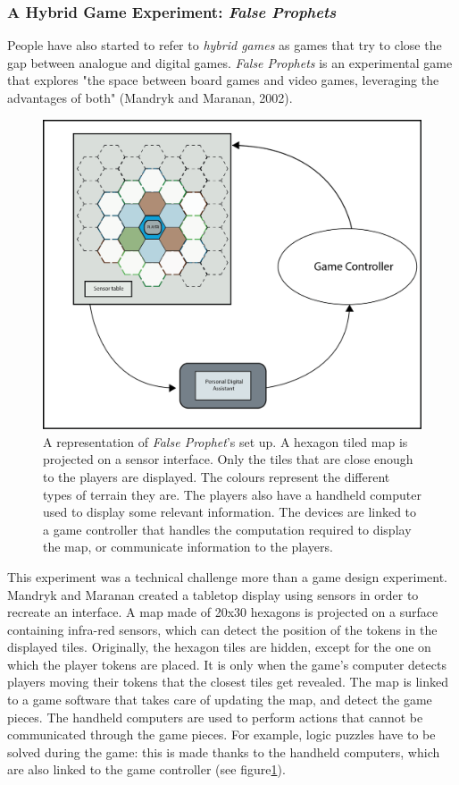\subsubsection{A Hybrid Game Experiment: \textit{False Prophets}}
People have also started to refer to \textit{hybrid games} as games that try to close the gap between analogue and digital games. \textit{False Prophets} is an experimental game that explores "the space between board games and video games, leveraging the advantages of both" (Mandryk and Maranan, 2002)\cite{art:prophets}. 

\begin{figure}[h]
    \centering
    \includegraphics[scale=1]{Images/f_p_fig.png}
    \caption{A representation of \textit{False Prophet}'s set up. A hexagon tiled map is projected on a sensor interface. Only the tiles that are close enough to the players are displayed. The colours represent the different types of terrain they are. The players also have a handheld computer used to display some relevant information. The devices are linked to a game controller that handles the computation required to display the map, or communicate information to the players.}
    \label{fig:falseprophet}
\end{figure}

This experiment was a technical challenge more than a game design experiment. Mandryk and Maranan created a tabletop display using sensors in order to recreate an interface. A map made of 20x30 hexagons is projected on a surface containing infra-red sensors, which can detect the position of the tokens in the displayed tiles. Originally, the hexagon tiles are hidden, except for the one on which the player tokens are placed. It is only when the game's computer detects players moving their tokens that the closest tiles get revealed. The map is linked to a game software that takes care of updating the map, and detect the game pieces. The handheld computers are used to perform actions that cannot be communicated through the game pieces. For example, logic puzzles have to be solved during the game: this is made thanks to the handheld computers, which are also linked to the game controller (see figure\ref{fig:falseprophet}). 

